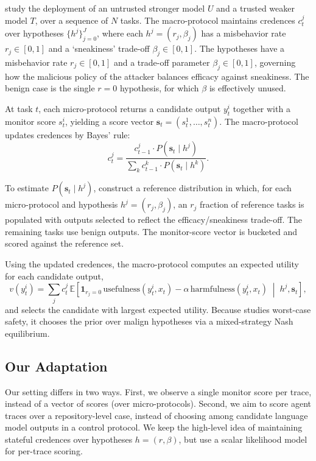 \documentclass{article} %
\begin{document}
\citet{DBLP:conf/iclr/WenHLBRSS00PSK25} study the deployment of an
untrusted stronger model $U$ and a trusted weaker model $T$, over a
sequence of $N$ tasks. The macro-protocol maintains credences $c_t^j$ over
hypotheses $\{h^j\}_{j=0}^J$, where each $h^j = (r_j, \beta_j)$ has a misbehavior rate $r_j \in [0,1]$ and a `sneakiness' trade-off $\beta_j \in [0,1]$. 
The hypotheses have a misbehavior rate $r_j \in [0,1]$ and a trade-off parameter $\beta_j \in [0,1]$, governing how the malicious policy of the attacker balances efficacy against sneakiness. The benign case is the single $r=0$ hypothesis, for
which $\beta$ is effectively unused.


At task $t$, each micro-protocol returns a candidate output $y_t^i$ together
with a monitor score $s_t^i$, yielding a score vector
$\mathbf{s}_t = (s_t^1,\dots,s_t^n)$. The macro-protocol updates credences by
Bayes' rule:
\begin{equation}
\label{eq:wen-credence-update}
c_t^j =
\frac{c_{t-1}^j \cdot P(\mathbf{s}_t \mid h^j)}
{\sum_k c_{t-1}^k \cdot P(\mathbf{s}_t \mid h^k)}.
\end{equation}

To estimate $P(\mathbf{s}_t \mid h^j)$, \citet{DBLP:conf/iclr/WenHLBRSS00PSK25} construct a reference distribution in which, for each micro-protocol and hypothesis $h^j=(r_j,\beta_j)$, an $r_j$ fraction of reference tasks is populated with outputs selected to reflect the efficacy/sneakiness trade-off. The remaining tasks use benign outputs.
The monitor-score vector is bucketed and scored against the reference set.


Using the updated credences, the macro-protocol computes an expected utility for
each candidate output,
\begin{equation}
v(y_t^i)
=
\sum_j c_t^j\,
\mathbb{E}\!\left[
\mathbf{1}_{r_j=0}\,\mathrm{usefulness}(y_t^i, x_t)
-
\alpha\,\mathrm{harmfulness}(y_t^i, x_t)
\;\middle|\;
h^j,\mathbf{s}_t
\right],
\end{equation}
and selects the candidate with largest expected utility. Because \citet{DBLP:conf/iclr/WenHLBRSS00PSK25} studies worst-case safety, it chooses the prior over malign hypotheses via a mixed-strategy Nash equilibrium.

\subsection{Our Adaptation}
\label{app:bayesian-adaptation}

Our setting differs in two ways. First, we observe a single monitor score per trace, instead of a vector of scores (over micro-protocols). Second, we aim to score agent traces over a repository-level case, instead of choosing among candidate language model outputs in a control protocol. We keep the high-level idea of maintaining stateful credences over hypotheses
$h=(r,\beta)$, but use a scalar likelihood model for per-trace scoring.
\end{document}
